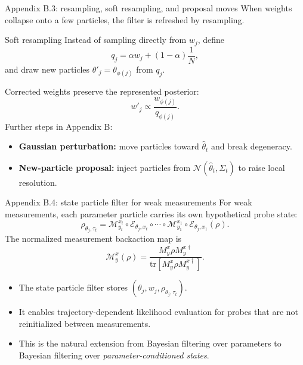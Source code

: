 \documentclass[aspectratio=169]{beamer}
\begin{document}
\begin{frame}{Appendix B.3: resampling, soft resampling, and proposal moves}
\small
When weights collapse onto a few particles, the filter is refreshed by resampling.
\vspace{0.25em}
\begin{block}{Soft resampling}
Instead of sampling directly from $w_j$, define
\[
  q_j=\alpha w_j + (1-\alpha)\frac{1}{N},
\]
and draw new particles $\theta'_j=\theta_{\phi(j)}$ from $q_j$.
\end{block}
Corrected weights preserve the represented posterior:
\[
  w'_j\propto \frac{w_{\phi(j)}}{q_{\phi(j)}}.
\]
Further steps in Appendix B:
\begin{itemize}
  \item \textbf{Gaussian perturbation:} move particles toward $\hat\theta_t$ and break degeneracy.
  \item \textbf{New-particle proposal:} inject particles from $\mathcal N(\hat\theta_t,\Sigma_t)$ to raise local resolution.
\end{itemize}
\normalsize
\end{frame}

\begin{frame}{Appendix B.4: state particle filter for weak measurements}
For weak measurements, each parameter particle carries its own hypothetical probe state:
\[
  \rho_{\theta_j,\tau_t}=\mathcal M^{x_t}_{y_t}\circ\mathcal E_{\theta_j,x_t}\circ\cdots\circ
  \mathcal M^{x_1}_{y_1}\circ\mathcal E_{\theta_j,x_1}(\rho).
\]
The normalized measurement backaction map is
\[
  \mathcal M^x_y(\rho)=\frac{M^x_y\rho M^{x\dagger}_y}{\mathrm{tr}[M^x_y\rho M^{x\dagger}_y]}.
\]
\begin{itemize}
  \item The state particle filter stores $(\theta_j,w_j,\rho_{\theta_j,\tau_t})$.
  \item It enables trajectory-dependent likelihood evaluation for probes that are not reinitialized between measurements.
  \item This is the natural extension from Bayesian filtering over parameters to Bayesian filtering over \emph{parameter-conditioned states}.
\end{itemize}
\end{frame}
\end{document}

